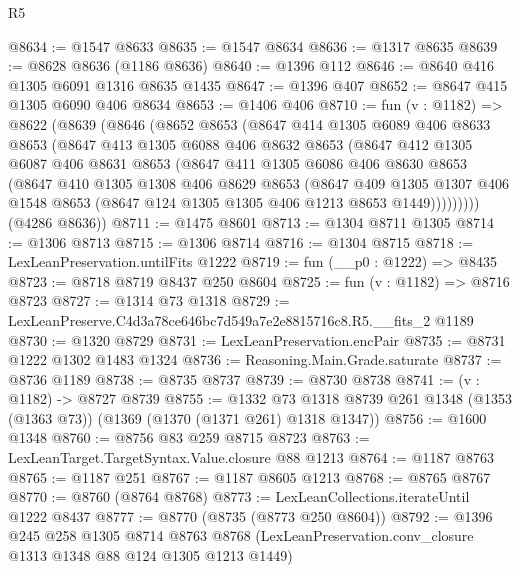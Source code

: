 \begin{lexlean}{R5}
\begin{coremodule}
@8634 := @1547 @8633
@8635 := @1547 @8634
@8636 := @1317 @8635
@8639 := @8628 @8636 (@1186 @8636)
@8640 := @1396 @112
@8646 := @8640 @416 @1305 @6091 @1316 @8635 @1435
@8647 := @1396 @407
@8652 := @8647 @415 @1305 @6090 @406 @8634
@8653 := @1406 @406
@8710 := fun (v : @1182) =>
  @8622
    (@8639
      (@8646
        (@8652
          @8653
          (@8647
            @414
            @1305
            @6089
            @406
            @8633
            @8653
            (@8647
              @413
              @1305
              @6088
              @406
              @8632
              @8653
              (@8647
                @412
                @1305
                @6087
                @406
                @8631
                @8653
                (@8647
                  @411
                  @1305
                  @6086
                  @406
                  @8630
                  @8653
                  (@8647
                    @410
                    @1305
                    @1308
                    @406
                    @8629
                    @8653
                    (@8647
                      @409
                      @1305
                      @1307
                      @406
                      @1548
                      @8653
                      (@8647 @124 @1305 @1305 @406 @1213 @8653 @1449)))))))))
      (@4286 @8636))
@8711 := @1475 @8601
@8713 := @1304 @8711 @1305
@8714 := @1306 @8713
@8715 := @1306 @8714
@8716 := @1304 @8715
@8718 := LexLeanPreservation.untilFits @1222
@8719 := fun (__p0 : @1222) => @8435
@8723 := @8718 @8719 @8437 @250 @8604
@8725 := fun (v : @1182) => @8716 @8723
@8727 := @1314 @73 @1318
@8729 := LexLeanPreserve.C4d3a78ce646bc7d549a7e2e8815716c8.R5.__fits_2 @1189
@8730 := @1320 @8729
@8731 := LexLeanPreservation.encPair
@8735 := @8731 @1222 @1302 @1483 @1324
@8736 := Reasoning.Main.Grade.saturate
@8737 := @8736 @1189
@8738 := @8735 @8737
@8739 := @8730 @8738
@8741 := (v : @1182) -> @8727 @8739
@8755 := @1332
    @73
    @1318
    @8739
    @261
    @1348
    (@1353 (@1363 @73))
    (@1369 (@1370 (@1371 @261) @1318 @1347))
@8756 := @1600 @1348
@8760 := @8756 @83 @259 @8715 @8723
@8763 := LexLeanTarget.TargetSyntax.Value.closure @88 @1213
@8764 := @1187 @8763
@8765 := @1187 @251
@8767 := @1187 @8605 @1213
@8768 := @8765 @8767
@8770 := @8760 (@8764 @8768)
@8773 := LexLeanCollections.iterateUntil @1222 @8437
@8777 := @8770 (@8735 (@8773 @250 @8604))
@8792 := @1396
    @245
    @258
    @1305
    @8714
    @8763
    @8768
    (LexLeanPreservation.conv_closure @1313 @1348 @88 @124 @1305 @1213 @1449)

\end{coremodule}
\end{lexlean}
